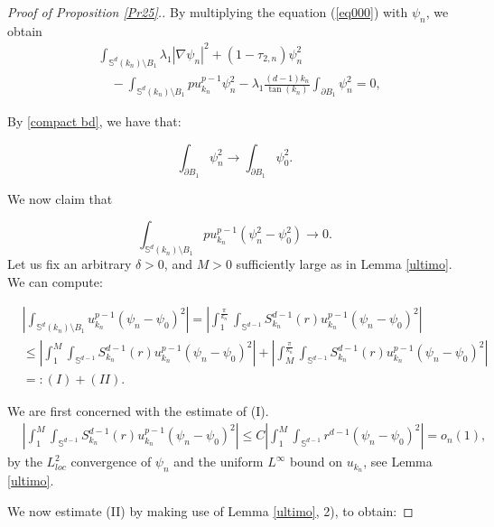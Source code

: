 \documentclass[reqno]{amsart}
\numberwithin{equation}{section}
\newenvironment{key words}{\textbf{Keywords}\mbox{  }}{ }
\begin{document}
\begin{proof}[Proof of Proposition \ref{Pr25}.]
\medskip

By multiplying the equation (\ref{eq000}) with $\psi_{n}$, we obtain
\begin{align}\label{preq040}
	&\int_{\mathbb{S}^{d}(k_{n})\setminus B_{1}} \lambda_{1} |\nabla \psi_{n}|^{2}+ (1-\tau_{2,n})\psi_{n}^{2}\nonumber\\
	&\quad-\int_{\mathbb{S}^{d}(k_{n})\setminus B_{1}} pu_{k_{n}}^{p-1}\psi_{n}^{2}-\lambda_{1}\frac{(d-1)k_n}{\tan(k_{n})}  \int_{\partial B_{1}}\psi_{n}^2=0,
\end{align}

By \eqref{compact bd}, we have that:

$$ \int_{\partial B_{1}}\psi_{n}^2 \to \int_{\partial B_{1}}\psi_{0}^2.$$

We now claim that

\begin{equation} \label{puff} \displaystyle \int_{\mathbb{S}^{d}(k_{n})\setminus B_{1}}pu_{k_{n}}^{p-1} (\psi_{n}^2 - \psi_0^2) \to 0.\end{equation} Let us fix an arbitrary $\delta>0$, and $M>0$ sufficiently large as in Lemma \ref{ultimo}. We can compute:

\begin{align*}
	&\left | \int_{\mathbb{S}^{d}(k_{n})\setminus B_{1}}  u_{k_{n}}^{p-1} (\psi_{n}- \psi_0)^2  \right | = \left | \int_{1}^{\frac{\pi}{k_{n}}} \int_{\mathbb{S}^{d-1}} S^{d-1}_{k_n}(r)  u_{k_{n}}^{p-1} (\psi_{n}- \psi_0)^2   \right |\\
	& \leq  \left | \int_{1}^{M} \int_{\mathbb{S}^{d-1}} S^{d-1}_{k_n}(r)  u_{k_{n}}^{p-1} (\psi_{n}- \psi_0)^2 \right |  + \left | \int_{M}^{\frac{\pi}{k_{n}}} \int_{\mathbb{S}^{d-1}} S^{d-1}_{k_n}(r)  u_{k_{n}}^{p-1} (\psi_{n}- \psi_0)^2    \right |\\
	&=: (I)+(II).
\end{align*}

We are first concerned with the estimate of (I).
\begin{align*}
	& \left | \int_{1}^{M} \int_{\mathbb{S}^{d-1}} S^{d-1}_{k_n}(r)  u_{k_{n}}^{p-1} (\psi_{n}- \psi_0)^2  \right | \le C \left | \int_{1}^{M} \int_{\mathbb{S}^{d-1}} r^{d-1}  (\psi_{n}- \psi_0)^2 \right | = o_n(1),
\end{align*}
by the $L^2_{loc}$ convergence of $\psi_n$ and the uniform $L^{\infty}$ bound on $u_{k_n}$, see Lemma \ref{ultimo}.

\medskip

We now estimate (II) by making use of Lemma \ref{ultimo}, 2), to obtain:


\end{proof}
\end{document}
